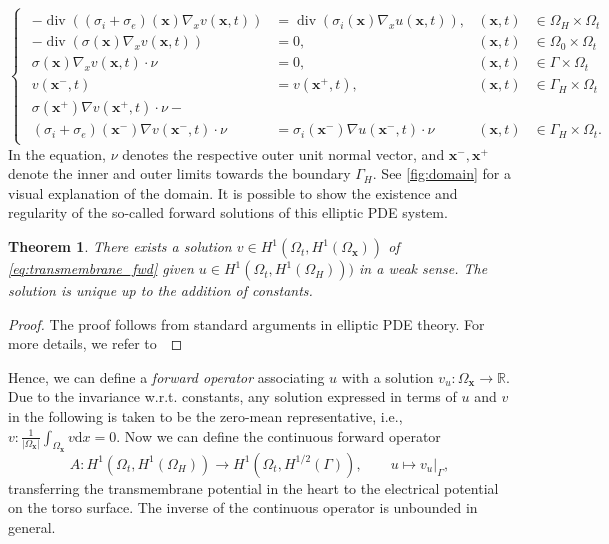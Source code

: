\documentclass{article}
\DeclareMathOperator{\Div}{div}
\newcommand{\dx}{\mathrm{d}}
\newcommand{\R}{\mathbb{R}}
\newcommand{\OmegaSpace}{\Omega_\mathbf{x}}
\newcommand{\OmegaTime}{\Omega_t}
\newtheorem{theorem}{Theorem}[section]
\begin{document}
	\begin{equation}
		\label{eq:transmembrane_fwd}
		\begin{cases}
			\begin{aligned}
				- \Div ((\sigma_i + \sigma_e)(\mathbf{x}) \nabla_x v(\mathbf{x},t)) &= \Div(\sigma_i(\mathbf{x}) \nabla_x u(\mathbf{x},t)) , & (\mathbf{x}, t)&\in \Omega_H \times \OmegaTime\\
				- \Div (\sigma(\mathbf{x}) \nabla_x v(\mathbf{x},t)) &=0 , & (\mathbf{x}, t)&\in \Omega_0 \times \OmegaTime\\
				\sigma(\mathbf{x}) \nabla_x v(\mathbf{x},t) \cdot \nu &= 0 , & (\mathbf{x}, t)&\in \Gamma \times \OmegaTime\\
				v(\mathbf{x}^-,t) &= v(\mathbf{x}^+, t) , & (\mathbf{x}, t)&\in \Gamma_H \times \OmegaTime\\
				\sigma(\mathbf{x}^+)\nabla v(\mathbf{x}^+, t) \cdot\nu - \\
				(\sigma_i + \sigma_e)(\mathbf{x}^-)\nabla v(\mathbf{x}^-, t) \cdot \nu &= \sigma_i(\mathbf{x}^-)\nabla u(\mathbf{x}^-, t)\cdot \nu  & (\mathbf{x}, t)&\in \Gamma_H \times \OmegaTime.
			\end{aligned}
		\end{cases}
	\end{equation}
	In the equation, $\nu$ denotes the respective outer unit normal vector, and $\mathbf{x}^-, \mathbf{x}^+$ denote the inner and outer limits towards the boundary $\Gamma_H$.
	See \cref{fig:domain} for a visual explanation of the domain.
	It is possible to show the existence and regularity of the so-called forward solutions of this elliptic PDE system.
	\begin{theorem}
		There exists a solution $v \in H^1\left(\OmegaTime, H^1(\OmegaSpace)\right)$ of \eqref{eq:transmembrane_fwd} given $u \in H^1\left(\OmegaTime, H^1(\Omega_H)\right))$ in a weak sense.
		The solution is unique up to the addition of constants.
		\label{thm:fwdsol_transmembrane}
	\end{theorem}
	\begin{proof}
		The proof follows from standard arguments in elliptic PDE theory.
		For more details, we refer to~\cite{Ev98}
	\end{proof}
	Hence, we can define a \emph{forward operator} associating $u$ with a solution $v_u\colon \OmegaSpace\rightarrow\R$.
	Due to the invariance w.r.t. constants, any solution expressed in terms of $u$ and $v$ in the following is taken to be the zero-mean representative, i.e., $v\colon\frac{1}{\vert\OmegaSpace\vert} \int_{\OmegaSpace} v \dx x = 0$.
	Now we can define the continuous forward operator 
	\begin{equation*}
		A\colon H^1\left(\OmegaTime, H^1(\Omega_H)\right)\rightarrow H^1\left(\OmegaTime, H^{1/2}(\Gamma)\right), \qquad u\mapsto v_u \vert_\Gamma,
	\end{equation*}
	transferring the transmembrane potential in the heart to the electrical potential on the torso surface.
	The inverse of the continuous operator is unbounded in general.
	
\end{document}
